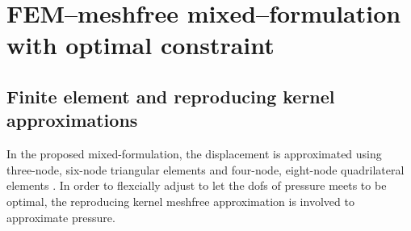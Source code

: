 \section{FEM--meshfree mixed--formulation with optimal constraint}

\subsection{Finite element and reproducing kernel approximations}

In the proposed mixed-formulation, the displacement is approximated using three-node, six-node triangular elements and four-node, eight-node quadrilateral elements \cite{hughes2000}. In order to flexcially adjust to let the dofs of pressure meets to be optimal, the reproducing kernel meshfree approximation is involved to approximate pressure.

